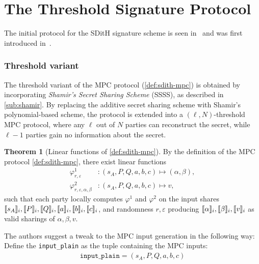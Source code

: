 \documentclass[11pt]{report}
\theoremstyle{definition}
\newtheorem{theorem}{Theorem}[section]
\theoremstyle{plain}
\begin{document}
\section{The Threshold Signature Protocol}\label{sec:sdith-signature}

The initial protocol for the SDitH signature scheme is seen in~\cite[Figure 1]{aguilarsyndrome11} and was first introduced in~\cite[Figure 1, p19]{feneuil2022syndrome}.

\subsubsection{Threshold variant}\label{sub:sdith-threshold-sss}

The threshold variant of the MPC protocol (\autoref{def:sdith-mpc}) is obtained by incorporating \textit{Shamir's Secret Sharing Scheme} (SSSS), as described in \autoref{sub:shamir}. By replacing the additive secret sharing scheme with Shamir's polynomial-based scheme, the protocol is extended into a $(\ell, N)$-threshold MPC protocol, where any $\ell$ out of $N$ parties can reconstruct the secret, while $\ell-1$ parties gain no information about the secret.

\begin{theorem}[Linear functions of \autoref{def:sdith-mpc}]\label{thm:sdith-mpc-linear}
  By the definition of the MPC protocol \autoref{def:sdith-mpc}, there exist linear functions
  \begin{align}
    \varphi^1_{r,\varepsilon}                 & : (s_A, P, Q, a, b, c) \mapsto (\alpha, \beta), \\
    \varphi^2_{r, \varepsilon, \alpha, \beta} & : (s_A, P, Q, a, b, c) \mapsto v,
  \end{align}
  such that each party locally computes $\varphi^1$ and $\varphi^2$ on the input shares $\llbracket s_A \rrbracket_i, \llbracket P \rrbracket_i, \llbracket Q \rrbracket_i, \llbracket a \rrbracket_i, \llbracket b \rrbracket_i, \llbracket c \rrbracket_i$, and randomness $r, \varepsilon$ producing $\llbracket \alpha \rrbracket_i, \llbracket \beta \rrbracket_i, \llbracket v \rrbracket_i$ as valid sharings of $\alpha, \beta, v$.
\end{theorem}

The authors suggest a tweak to the MPC input generation in the following way: Define the \texttt{input\_plain} as the tuple containing the MPC inputs:
\begin{align*}
  \texttt{input\_plain} = (s_A, P, Q, a, b, c)
\end{align*}
\end{document}

